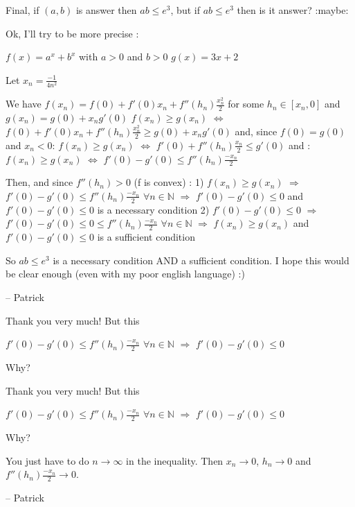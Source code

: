 \begin{mysolution}
	\begin{tcolorbox}Final, if $(a,b)$ is answer then $ab\leq e^{3}$, but if $ab\leq e^{3}$ then is it answer?  :maybe:\end{tcolorbox}

Ok, I'll try to be more precise :

$f(x)=a^{x}+b^{x}$  with $a>0$ and $b>0$
$g(x)=3x+2$

Let $x_{n}=\frac{-1}{4n^{2}}$

We have $f(x_{n})=f(0)+f'(0)x_{n}+f''(h_{n})\frac{x_{n}^{2}}{2}$ for some $h_{n}\in [x_{n},0]$ and $g(x_{n})=g(0)+x_{n}g'(0)$
$f(x_{n})\geq g(x_{n})$ $\Leftrightarrow$ $f(0)+f'(0)x_{n}+f''(h_{n})\frac{x_{n}^{2}}{2}\geq g(0)+x_{n}g'(0)$ and, since $f(0)=g(0)$ and $x_{n}<0$:
$f(x_{n})\geq g(x_{n})$ $\Leftrightarrow$ $f'(0)+f''(h_{n})\frac{x_{n}}{2}\leq g'(0)$ and :
$f(x_{n})\geq g(x_{n})$ $\Leftrightarrow$ $f'(0)-g'(0)\leq f''(h_{n})\frac{-x_{n}}{2}$

Then, and since $f''(h_{n})>0$ (f is convex) :
1) $f(x_{n})\geq g(x_{n})$ $\Rightarrow $ $f'(0)-g'(0)\leq f''(h_{n})\frac{-x_{n}}{2}$ $\forall n\in\mathbb{N}$ $\Rightarrow $ $f'(0)-g'(0)\leq 0$ and  $f'(0)-g'(0)\leq 0$ is a necessary condition
2)  $f'(0)-g'(0)\leq 0$ $\Rightarrow $ $f'(0)-g'(0)\leq 0\leq f''(h_{n})\frac{-x_{n}}{2}$ $\forall n\in\mathbb{N}$ $\Rightarrow $ $f(x_{n})\geq g(x_{n})$ and  $f'(0)-g'(0)\leq 0$ is a sufficient condition

So $ab\leq e^{3}$ is a necessary condition AND a sufficient condition.
I hope this would be clear enough (even with my poor english language)  :) 

-- 
Patrick
\end{mysolution}



\begin{mysolution}
	Thank you very much! But this
\begin{tcolorbox} $f'(0)-g'(0)\leq f''(h_{n})\frac{-x_{n}}{2}$ $\forall n\in\mathbb{N}$ $\Rightarrow$ $f'(0)-g'(0)\leq 0$ \end{tcolorbox}
Why?
\end{mysolution}



\begin{mysolution}
	\begin{tcolorbox}Thank you very much! But this
\begin{tcolorbox} $f'(0)-g'(0)\leq f''(h_{n})\frac{-x_{n}}{2}$ $\forall n\in\mathbb{N}$ $\Rightarrow$ $f'(0)-g'(0)\leq 0$ \end{tcolorbox}
Why?\end{tcolorbox}

You just have to do $n\rightarrow\infty$ in the inequality. Then $x_{n}\rightarrow 0$, $h_{n}\rightarrow 0$ and $f''(h_{n})\frac{-x_{n}}{2}\rightarrow 0$.

-- 
Patrick
\end{mysolution}



